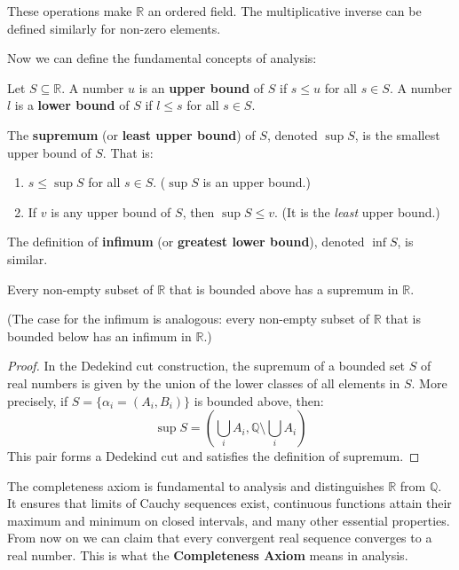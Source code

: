 These operations make $\mathbb{R}$ an ordered field. The multiplicative inverse can be defined similarly for non-zero elements.

Now we can define the fundamental concepts of analysis:

\begin{definition}
Let $S \subseteq \mathbb{R}$. A number $u$ is an \textbf{upper bound} of $S$ if $s \le u$ for all $s \in S$. A number $l$ is a \textbf{lower bound} of $S$ if $l \le s$ for all $s \in S$.
\end{definition}

\begin{definition}[Supremum]
The \textbf{supremum} (or \textbf{least upper bound}) of $S$, denoted $\sup S$, is the smallest upper bound of $S$. That is:
\begin{enumerate}
    \item $s \le \sup S$ for all $s \in S$. ($\sup S$ is an upper bound.)
    \item If $v$ is any upper bound of $S$, then $\sup S \le v$. (It is the \emph{least} upper bound.)
\end{enumerate}
The definition of \textbf{infimum} (or \textbf{greatest lower bound}), denoted $\inf S$, is similar.
\end{definition}

\begin{theorem}
Every non-empty subset of $\mathbb{R}$ that is bounded above has a supremum in $\mathbb{R}$.
\end{theorem}
(The case for the infimum is analogous: every non-empty subset of $\mathbb{R}$ that is bounded below has an infimum in $\mathbb{R}$.)

\begin{proof}
In the Dedekind cut construction, the supremum of a bounded set $S$ of real numbers is given by the union of the lower classes of all elements in $S$. More precisely, if $S = \{\alpha_i = (A_i, B_i)\}$ is bounded above, then:
\[
\sup S = \left(\bigcup_i A_i, \mathbb{Q} \setminus \bigcup_i A_i\right)
\]
This pair forms a Dedekind cut and satisfies the definition of supremum.
\end{proof}

The completeness axiom is fundamental to analysis and distinguishes $\mathbb{R}$ from $\mathbb{Q}$. It ensures that limits of Cauchy sequences exist, continuous functions attain their maximum and minimum on closed intervals, and many other essential properties. From now on we can claim that every convergent real sequence converges to a real number. This is what the \textbf{Completeness Axiom} means in analysis.

